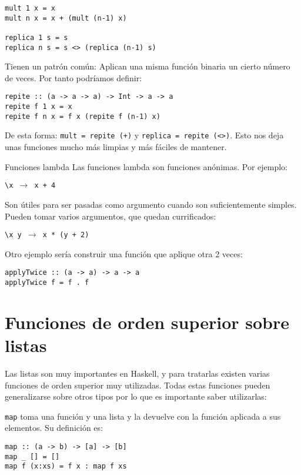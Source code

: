 \begin{lstlisting}
mult 1 x = x
mult n x = x + (mult (n-1) x)

replica 1 s = s
replica n s = s <> (replica (n-1) s)
\end{lstlisting}

Tienen un patrón común: Aplican una misma función binaria un cierto número de
veces. Por tanto podríamos definir:

\begin{lstlisting}
repite :: (a -> a -> a) -> Int -> a -> a
repite f 1 x = x
repite f n x = f x (repite f (n-1) x)
\end{lstlisting}

De esta forma:
\texttt{mult = repite (+)} y \texttt{replica = repite (<>)}.
Esto nos deja unas funciones mucho más limpias y más fáciles de mantener.

\begin{extra}{Funciones lambda}
Las funciones lambda son funciones anónimas. Por ejemplo:

\espacio

\texttt{\textbackslash x $\to$  x + 4}

\espacio

Son útiles para ser pasadas como argumento cuando son suficientemente simples.
Pueden tomar varios argumentos, que quedan currificados:

\espacio

\texttt{\textbackslash x y $\to$ x * (y + 2)}

\end{extra}

Otro ejemplo sería construir una función que aplique otra 2 veces:

\begin{lstlisting}
applyTwice :: (a -> a) -> a -> a
applyTwice f = f . f
\end{lstlisting}

\section{Funciones de orden superior sobre listas}
Las listas son muy importantes en Haskell, y para tratarlas existen varias
funciones de orden superior muy utilizadas. Todas estas funciones pueden
generalizarse sobre otros tipos por lo que es importante saber utilizarlas:

\texttt{map} toma una función y una lista y la devuelve con la función aplicada
a sus elementos. Su definición es:
\begin{lstlisting}
map :: (a -> b) -> [a] -> [b]
map _ [] = []
map f (x:xs) = f x : map f xs
\end{lstlisting}

